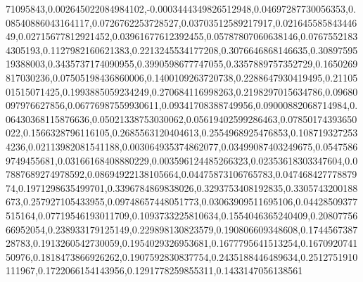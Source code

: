 71095843,0.002645022084984102,-0.0003444349826512948,0.04697287730056353,0.08540886043164117,0.0726762253728527,0.03703512589217917,0.02164558584344649,0.02715677812921452,0.03961677612392455,0.05787807060638146,0.07675521834305193,0.1127982160621383,0.2213245534177208,0.3076646868146635,0.3089759519388003,0.3435737174090955,0.3990598677747055,0.3357889757352729,0.1650269817030236,0.07505198436860006,0.1400109263720738,0.2288647930419495,0.2110501515071425,0.1993885059234249,0.270684116998263,0.2198297015634786,0.09680097976627856,0.06776987559930611,0.09341708388749956,0.09000882068714984,0.06430368115876636,0.05021338753030062,0.05619402599286463,0.07850174393650022,0.1566328796116105,0.2685563120404613,0.2554968925476853,0.1087193272534236,0.02113982081541188,0.003064935374862077,0.03499087403249675,0.05475869749455681,0.03166168408880229,0.003596124485266323,0.02353618303347604,0.07887689274978592,0.08694922138105664,0.04475873106765783,0.04746842777887974,0.1971298635499701,0.3396784869838026,0.3293753408192835,0.3305743200188673,0.257927105433955,0.09748657448051773,0.03063909511695106,0.04428509377515164,0.07719546193011709,0.1093733225810634,0.1554046365240409,0.2080775666952054,0.238933179125149,0.229898130823579,0.190806609348608,0.174456738728783,0.1913260542730059,0.1954029326953681,0.1677795641513254,0.167092074150976,0.1818473866926262,0.1907592830837754,0.2435188446489634,0.2512751910111967,0.1722066154143956,0.1291778259855311,0.1433147056138561
